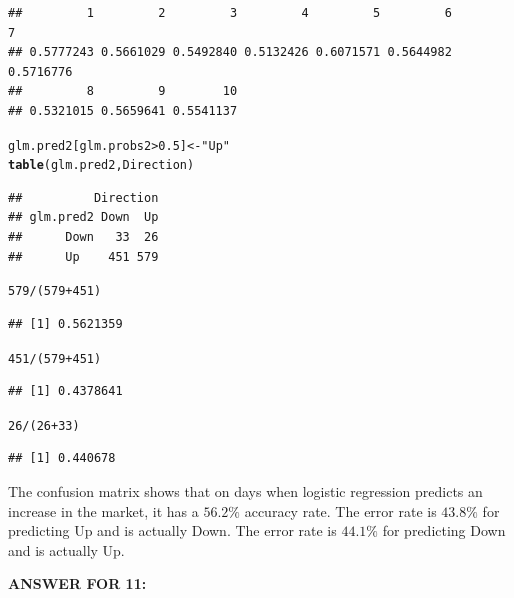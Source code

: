 \documentclass{article}\usepackage[]{graphicx}\usepackage[]{color}
\makeatletter
\newcommand{\hlnum}[1]{\textcolor[rgb]{0.686,0.059,0.569}{#1}}%
\newcommand{\hlstr}[1]{\textcolor[rgb]{0.192,0.494,0.8}{#1}}%
\newcommand{\hlopt}[1]{\textcolor[rgb]{0,0,0}{#1}}%
\newcommand{\hlstd}[1]{\textcolor[rgb]{0.345,0.345,0.345}{#1}}%
\newcommand{\hlkwb}[1]{\textcolor[rgb]{0.69,0.353,0.396}{#1}}%
\newcommand{\hlkwd}[1]{\textcolor[rgb]{0.737,0.353,0.396}{\textbf{#1}}}%
\newenvironment{kframe}{%
 \def\at@end@of@kframe{}%
 \ifinner\ifhmode%
  \def\at@end@of@kframe{\end{minipage}}%
  \begin{minipage}{\columnwidth}%
 \fi\fi%
 \def\FrameCommand##1{\hskip\@totalleftmargin \hskip-\fboxsep
 \colorbox{shadecolor}{##1}\hskip-\fboxsep
     \hskip-\linewidth \hskip-\@totalleftmargin \hskip\columnwidth}%
 \MakeFramed {\advance\hsize-\width
   \@totalleftmargin\z@ \linewidth\hsize
   \@setminipage}}%
 {\par\unskip\endMakeFramed%
 \at@end@of@kframe}
\newenvironment{knitrout}{}{} %
\makeatother
\begin{document}
\begin{enumerate}[(a)]
\begin{knitrout}
\begin{kframe}
\begin{verbatim}
##         1         2         3         4         5         6         7 
## 0.5777243 0.5661029 0.5492840 0.5132426 0.6071571 0.5644982 0.5716776 
##         8         9        10 
## 0.5321015 0.5659641 0.5541137
\end{verbatim}
\begin{alltt}
\hlstd{glm.pred2[glm.probs2}\hlopt{>}\hlnum{0.5}\hlstd{]}\hlkwb{<-}\hlstr{"Up"}
\hlkwd{table}\hlstd{(glm.pred2,Direction)}
\end{alltt}
\begin{verbatim}
##          Direction
## glm.pred2 Down  Up
##      Down   33  26
##      Up    451 579
\end{verbatim}
\begin{alltt}
\hlnum{579}\hlopt{/}\hlstd{(}\hlnum{579}\hlopt{+}\hlnum{451}\hlstd{)}
\end{alltt}
\begin{verbatim}
## [1] 0.5621359
\end{verbatim}
\begin{alltt}
\hlnum{451}\hlopt{/}\hlstd{(}\hlnum{579}\hlopt{+}\hlnum{451}\hlstd{)}
\end{alltt}
\begin{verbatim}
## [1] 0.4378641
\end{verbatim}
\begin{alltt}
\hlnum{26}\hlopt{/}\hlstd{(}\hlnum{26}\hlopt{+}\hlnum{33}\hlstd{)}
\end{alltt}
\begin{verbatim}
## [1] 0.440678
\end{verbatim}
\end{kframe}
\end{knitrout}

The confusion matrix shows that on days when logistic regression predicts an increase in the market, it has a $56.2\%$ accuracy rate. The error rate is $43.8\%$ for predicting Up and is actually Down. The error rate is $44.1\%$ for predicting Down and is actually Up.
\end{enumerate}

\textbf{ANSWER FOR 11:} \\
\end{document}
